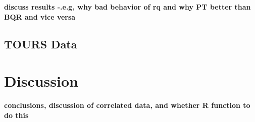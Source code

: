 \documentclass[12pt]{article}
\begin{document}
{\bf discuss results -.e.g, why bad behavior of rq and why PT better
  than BQR and vice versa}

\subsection{TOURS Data}
% 
% 

\section{Discussion}
{\bf conclusions, discussion of correlated data, and whether R
  function to do this}
\end{document}
